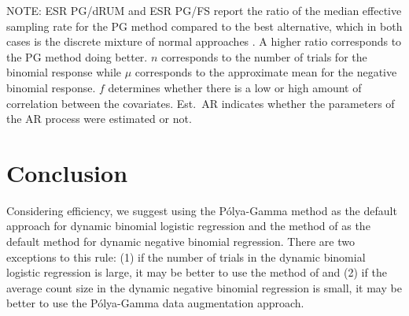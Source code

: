 \documentclass[12pt]{article}
\newcommand{\Polya}{P\'{o}lya}
\begin{document}
\begin{table}
\begin{center}
\begin{tabular}{l l c c}
    \end{tabular}
  \end{center}

NOTE: ESR PG/dRUM and ESR PG/FS report the ratio of the median effective
sampling rate for the PG method compared to the best alternative, which in both
cases is the discrete mixture of normal approaches \citep{fussl-etal-2013,
  fruhwirth-schnatter-etal-2009}.  A higher ratio corresponds to the PG method
doing better.  $n$ corresponds to the number of trials for the binomial response
while $\mu$ corresponds to the approximate mean for the negative binomial
response.  $f$ determines whether there is a low or high amount of correlation
between the covariates.  Est.\ AR indicates whether the parameters of the AR
process were estimated or not.

\end{table}

\section{Conclusion}

Considering efficiency, we suggest using the \Polya-Gamma method as the default
approach for dynamic binomial logistic regression and the method of
\cite{fruhwirth-schnatter-etal-2009} as the default method for dynamic negative
binomial regression.  There are two exceptions to this rule: (1) if the number
of trials in the dynamic binomial logistic regression is large, it may be better
to use the method of \cite{fussl-etal-2013} and (2) if the average count size in
the dynamic negative binomial regression is small, it may be better to use the
\Polya-Gamma data augmentation approach.
\end{document}
